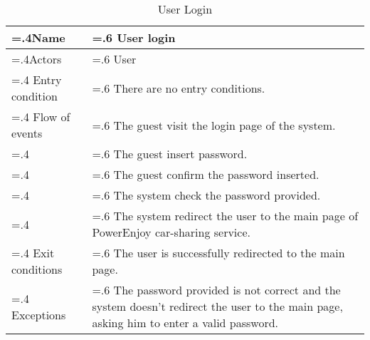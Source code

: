 \documentclass[10pt, a4paper,titlepage]{article}
\begin{document}
\begin{table}[h]
\caption{User Login} \label{tab:scenario2}
\begin{tabularx}{\textwidth}{|>{\hsize=.4\hsize}X|>{\hsize=.6\hsize}X|}
\hline
Name & User login \\
\hline
Actors & User \\
\hline
Entry condition & There are no entry conditions. \\
\hline
Flow of events & The guest visit the login page of the system. \\
& The guest insert password.\\
& The guest confirm the password inserted.\\
& The system check the password provided.\\
& The system redirect the user to the main page of PowerEnjoy car-sharing service.\\
\hline
Exit conditions & The user is successfully redirected to the main page. \\
\hline
Exceptions & The password provided is not correct and the system doesn't redirect the user to the main page, asking him to enter a valid password.\\
\hline
\end{tabularx}
\end{table}
\end{document}
